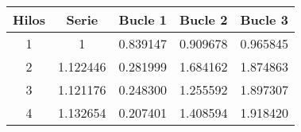 \begin{tabular}{|c|c|c|c|c|}
\hline \textbf{Hilos} & \textbf{Serie} & \textbf{Bucle 1} & \textbf{Bucle 2} & \textbf{Bucle 3
}\\ 
\hline 1 & 1 & 0.839147 & 0.909678 & 0.965845
\\ 
\hline 2 & 1.122446 & 0.281999 & 1.684162 & 1.874863
\\ 
\hline 3 & 1.121176 & 0.248300 & 1.255592 & 1.897307
\\ 
\hline 4 & 1.132654 & 0.207401 & 1.408594 & 1.918420
\\ 
\hline\end{tabular}